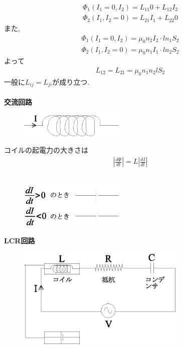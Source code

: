 \documentclass[../main]{subfiles}
\begin{document}
\begin{eqnarray*}
\Phi_1(I_1=0,I_2) = L_{11}0+L_{12}I_2 \\
\Phi_2(I_1,I_2=0) = L_{21}I_1+L_{22}0
\end{eqnarray*}
また,
\begin{eqnarray*}
\Phi_1(I_1=0,I_2) = \mu_0 n_2 I_2 \cdot l n_1 S_2 \\
\Phi_2(I_1,I_2=0) = \mu_0 n_1 I_1 \cdot l n_2 S_2
\end{eqnarray*}
よって
\begin{eqnarray*}
L_{12}=L_{21}=\mu_0n_1n_2lS_2
\end{eqnarray*}
一般に$L_{ij}=L_{ji}$が成り立つ. \\
\\
{\bf 交流回路} \\

\begin{figure}[htbp]
 \begin{center}
  \includegraphics[width=50mm]{11.5.eps}
 \end{center}
 \caption{}
 \label{fig:one}
\end{figure}

コイルの起電力の大きさは
\begin{eqnarray*}
\left| \frac{d \Phi}{dt} \right| = L\left|\frac{d I}{dt} \right|
\end{eqnarray*}
\\

\begin{figure}[htbp]
 \begin{center}
  \includegraphics[width=50mm]{11.6.eps}
 \end{center}
 \caption{}
 \label{fig:one}
\end{figure}

\newpage

{\bf LCR回路} \\

\begin{figure}[htbp]
 \begin{center}
  \includegraphics[width=80mm]{11.7.eps}
 \end{center}
 \caption{}
 \label{fig:one}
\end{figure}
\end{document}
